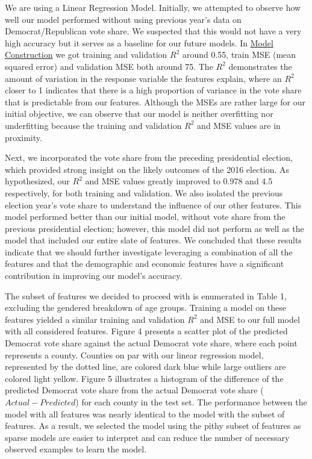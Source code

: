 \documentclass[letterpaper, twocolumn]{article}
\begin{document}
We are using a Linear Regression Model. Initially, we attempted to observe how well our model performed without using previous year’s data on Democrat/Republican vote share. We suspected that this would not have a very high accuracy but it serves as a baseline for our future models. In \href{https://tinyurl.com/y358omxq}{Model Construction} we got training and validation $R^2$ around 0.55, train MSE (mean squared error) and validation MSE both around 75. The $R^2$ demonstrates the amount of variation in the response variable the features explain, where an $R^2$ closer to 1 indicates that there is a high proportion of variance in the vote share that is predictable from our features. Although the MSEs are rather large for our initial objective, we can observe that our model is neither overfitting nor underfitting because the training and validation $R^2$ and MSE values are in proximity. 

Next, we incorporated the vote share from the preceding presidential election, which provided strong insight on the likely outcomes of the 2016 election. As hypothesized, our $R^2$ and MSE values greatly improved to 0.978 and 4.5 respectively, for both training and validation. We also isolated the previous election year’s vote share to understand the influence of our other features. This model performed better than our initial model, without vote share from the previous presidential election; however, this model did not perform as well as the model that included our entire slate of features. We concluded that these results indicate that we should further investigate leveraging a combination of all the features and that the demographic and economic features have a significant contribution in improving our model’s accuracy. 

The subset of features we decided to proceed with is enumerated in Table 1, excluding the gendered breakdown of age groups. Training a model on these features yielded a similar training and validation $R^2$ and MSE to our full model with all considered features. Figure 4 presents a scatter plot of the predicted Democrat vote share against the actual Democrat vote share, where each point represents a county. Counties on par with our linear regression model, represented by the dotted line, are colored dark blue while  large outliers are colored light yellow. Figure 5 illustrates a histogram of the difference of the predicted Democrat vote share from the actual Democrat vote share ($Actual - Predicted$) for each county in the test set. The performance between the model with all features was nearly identical to the model with the subset of features. As a result, we selected the model using the pithy subset of features as sparse models are easier to interpret and can reduce the number of necessary observed examples to learn the model.
\end{document}
